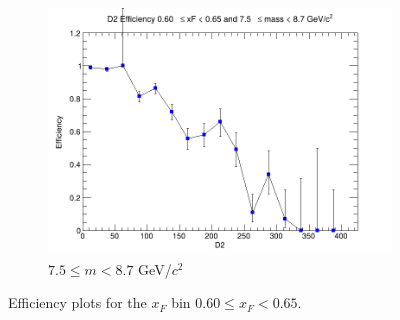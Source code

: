 \documentclass[11pt]{article}
\begin{document}
\begin{figure}[p]
\begin{subfigure}[b]{0.32\textwidth}
        \includegraphics[width=\textwidth]{./kTrackerEfficiencyPlots/D2_Efficiency_xF12_mass10.png}
        \caption{$7.5 \leq m < 8.7$ GeV/$c^2$}
    \end{subfigure}
    \caption{Efficiency plots for the $x_F$ bin $0.60 \leq x_F < 0.65$.}
\end{figure}
\end{document}
